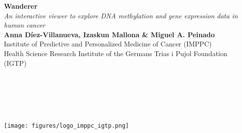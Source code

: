 \documentclass[a0,portrait]{a0poster}
\begin{document}
\fontsize{28}{30}\selectfont 



\begin{minipage}[t]{0.75\linewidth}
\veryHuge \color{boxcol} \textbf{Wanderer} \color{black}\\[-2cm] %

\Huge\textit{An interactive viewer to explore DNA methylation and gene expression data in human cancer}\\[-1cm] %

\LARGE \textbf{Anna D{\'i}ez-Villanueva, Izaskun Mallona \& Miguel A. Peinado}\\[0.5cm] %
\LARGE Institute of Predictive and Personalized Medicine of Cancer (IMPPC) \\[0.4cm] %
\LARGE Health Science Research Institute of the Germans Trias i Pujol Foundation (IGTP) \\[0.4cm] %

\end{minipage}
%
\begin{minipage}[t][4em][c]{0.25\linewidth}
\textcolor{white}{qqqqqqqqqqqq qqqqqqqqqqqq qqqqqqqqqqqq qqqqqqqqqqqq qqqqqqqqqqqq qqqqqqqqqqqq qqqqqqqqqqqq qqqqqqqqqqqq qqqqqqq qqqqqqqqqqqqqqqq qqqqqqqqqqqq qqqqqqqqqqqq qqqqqqqqqqqq qqqqqqqqqqqq qqqqqqqqqqqq qqqqqqqqqqqq qqqqqqq qqqqqqqqqqqqqqqq qqqqqqqqqqqq qqqqqqqqqqqq qqqqqqqqqqqq qqqqqqqqqqqq qqqqqqqqqqqq qqqqqqqqqqqq qqqqqqq qqqq}
\texttt{[image: figures/logo\_imppc\_igtp.png]}\\
\end{minipage}
\end{document}
